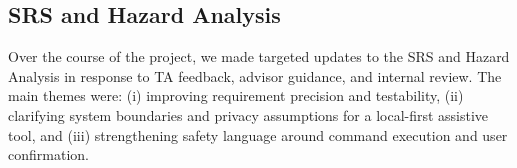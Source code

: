 \documentclass{article}
\begin{document}
\subsection{SRS and Hazard Analysis}

Over the course of the project, we made targeted updates to the SRS and Hazard
Analysis in response to TA feedback, advisor guidance, and internal review. The
main themes were: (i) improving requirement precision and testability, (ii)
clarifying system boundaries and privacy assumptions for a local-first assistive
tool, and (iii) strengthening safety language around command execution and user
confirmation.
\end{document}
